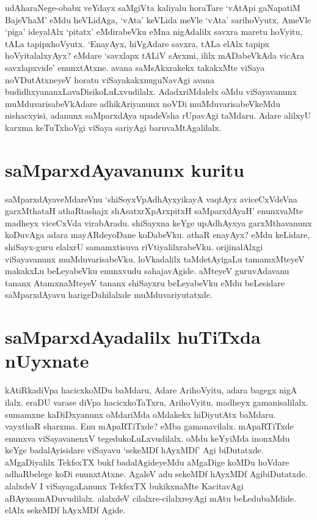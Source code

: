 udAharaNege-obabx veYdayx saMgiVta kaliyalu horaTare `vAtApi gaNapatiM BajeV\s haM'\label{45} eMdu heVLidAga, `vAta' keVLida meVle `vAta' sarihoVyutx, AmeVle  `piga' ideyalAlx `pitatx' eMdirabeVku eMna nigAdalilx savxra maretu hoVyitu, tALa tapipxhoVyutx. `EnayAyx, hiVgAdare savxra, tALa elAlx tapipx hoVyitalalxyAyx? eMdare `savxlapx tALiV sAvxmi, ililx mADabeVkAda vicAra savxlapxvide' enunxtAtxne. avana saMsAkxrakekx takakxMte viSaya noVDutAtxneyeV horatu viSayakakxnuguNavAgi avana budidhxyananxLavaDisikoLuLxvudilalx. AdadxriMdalelx oMdu viSayavanunx muMduvarisabeVkAdare adhikAriyanunx noVDi muMduvarisabeVkeMdu nishacxyisi, adanunx saMparxdAya upadeVsha rUpavAgi taMdaru. Adare alilxyU karxma keTuTxhoVgi viSaya sariyAgi baruvaMtAgalilalx. 

\section*{saMparxdAyavanunx kuritu}
 
saMparxdAyaveMdareVnu `shiSoyxVpAdhAyxyikayA vaqtAyx \label{45a} aviceCxVdeVna garxMthataH athaRtashajx shAsatxrXpArxpitxH saMparxdAyaH' enunxvaMte madheyx viceCxVda virabAradu. shiSayxna keYge upAdhAyxya garxMthavanunx koDuvAga adara mayARdeyoDane koDabeVku. athaR enayAyx? eMdu keLidare, shiSayx-guru elalxrU samamxtisuva riVtiyalilxrabeVku. orijinalAlxgi viSayavanunx muMduvarisabeVku. loVkadalilx taMdetAyigaLu tamamxMteyeV makakxLu beLeyabeVku enunxvudu sahajavAgide. aMteyeV guruvAdavanu tananx AtamxnaMteyeV tananx shiSayxru beLeyabeVku eMdu beLesidare saMparxdAyavu harigeDahilalxde muMduvariyutatxde. 

\section*{saMparxdAyadalilx huTiTxda nUyxnate}

kAtiRkadiVpa hacicxkoMDu baMdaru, Adare ArihoVyitu, adara bagegx nigA ilalx. eraDU varase diVpa hacicxkoTaTxru, ArihoVyitu, madheyx gamanisalilalx. sumamxne kaDiDxyanunx oMdariMda oMdakekx hiDiyutAtx baMdaru. vayxthaR sharxma. Enu mApaRTiTxde? eMba gamanavilalx. mApaRTiTxde enunxva viSayavanenxV tegedukoLuLxvudilalx. oMdu keYyiMda inonxMdu keYge badalAyisidare viSayavu `sekeMDf hAyxMDf' Agi biDutatxde. aMgaDiyalilx TekfsxTX  bukf badalAgideyeMdu aMgaDige koMDu hoVdare adhaRbelege koDi enunxtAtxne. AgaleV adu sekeMDf hAyxMDf AgibiDutatxde. alalxdeV I viSayagaLanunx TekfsxTX bukikxnaMte KacitavAgi aBAyxsamADuvudilalx. alalxdeV cilalxre-cilalxreyAgi mAtu beLedubaMdide. elAlx sekeMDf hAyxMDf Agide.

